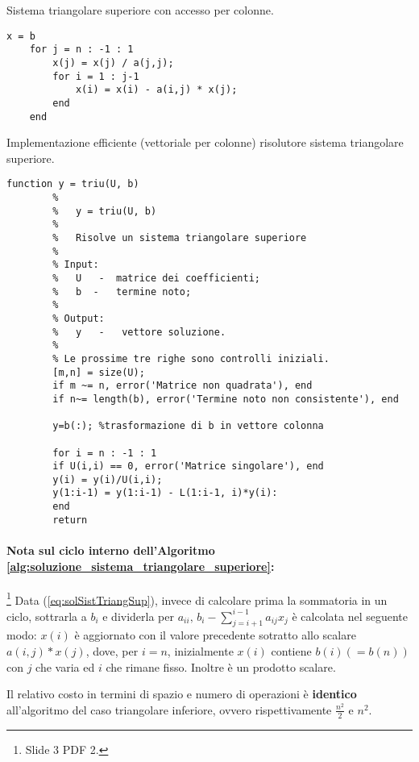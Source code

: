 \begin{algorithm}\caption{Sistema triangolare superiore con accesso per colonne.}
\label{alg:soluzione_sistema_triangolare_superiore_colonne}
    \begin{lstlisting}[style=Matlab-editor]
    x = b
    for j = n : -1 : 1
        x(j) = x(j) / a(j,j);
        for i = 1 : j-1
            x(i) = x(i) - a(i,j) * x(j);
        end
    end
    \end{lstlisting}
\end{algorithm}

\begin{algorithm}
	\caption{Implementazione efficiente (vettoriale per colonne) risolutore sistema triangolare superiore.}\label{alg:triu}
	\begin{lstlisting}[style=Matlab-editor]
		function y = triu(U, b)
		%   
		%   y = triu(U, b)
		%
		%   Risolve un sistema triangolare superiore
		%
		% Input:
		%   U   -  matrice dei coefficienti;
		%   b  -   termine noto;
		%   
		% Output:
		%   y   -   vettore soluzione.
		%
		% Le prossime tre righe sono controlli iniziali.
		[m,n] = size(U);
		if m ~= n, error('Matrice non quadrata'), end
		if n~= length(b), error('Termine noto non consistente'), end
		
		y=b(:); %trasformazione di b in vettore colonna
		
		for i = n : -1 : 1
		if U(i,i) == 0, error('Matrice singolare'), end
		y(i) = y(i)/U(i,i);
		y(1:i-1) = y(1:i-1) - L(1:i-1, i)*y(i):
		end
		return
	\end{lstlisting}
\end{algorithm}

\paragraph{Nota sul ciclo interno dell'Algoritmo \ref{alg:soluzione_sistema_triangolare_superiore}:} \footnote{Slide 3 PDF 2.}
Data (\ref{eq:solSistTriangSup}), invece di calcolare prima la sommatoria in un ciclo, sottrarla a $b_i$ e dividerla per $a_{ii},\, b_i-\sum_{j=i+1}^{i-1}a_{ij}x_j$ è calcolata nel seguente modo: $x(i)$ è aggiornato con il valore precedente sotratto allo scalare $a(i,j)*x(j)$, dove, per $i=n$, inizialmente $x(i)$ contiene $b(i)(=b(n))$ con $j$ che varia ed $i$ che rimane fisso. Inoltre è un prodotto scalare.

Il relativo costo in termini di spazio e numero di operazioni è \textbf{identico} all'algoritmo del caso triangolare inferiore, ovvero rispettivamente $\frac{n^2}{2}$ e $n^2$. 


